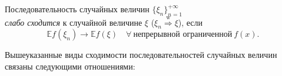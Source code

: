 \begin{defn}
    Последовательность случайных величин $\{\xi_n\}_{n=1}^{+\infty}$ \\
    \textit{слабо сходится} к случайной величине $\xi$ ($\xi_n \stackrel{\text{w}}{\Rightarrow} \xi$), если
    \begin{equation*}
        \mathbb{E} f\left(\xi_{n}\right) \rightarrow \mathbb{E} f(\xi) \quad \forall~ \text{непрерывной ограниченной}~ f(x).
    \end{equation*}
\end{defn}
\begin{thm*}
    Вышеуказанные виды сходимости последовательностей случайных величин связаны следующими отношениями:
    
    {
   }
\end{thm*}

